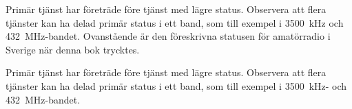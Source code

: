Primär tjänst har företräde före tjänst med lägre status.
Observera att flera tjänster kan ha delad primär status i ett band, som till
exempel i 3500~kHz och 432~MHz-bandet.
Ovanstående är den föreskrivna statusen för amatörradio i Sverige när
denna bok trycktes.

Primär tjänst har företräde före tjänst med lägre status.
Observera att flera tjänster kan ha delad primär status i ett band,
som till exempel i 3500~kHz- och 432~MHz-bandet.

